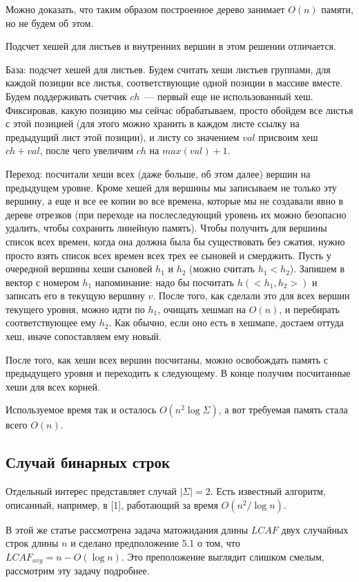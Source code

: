 {Можно доказать, что таким образом построенное дерево занимает $O(n)$ памяти, но не будем об этом.

Подсчет хешей для листьев и внутренних вершин в этом решении отличается.

База: подсчет хешей для листьев. Будем считать хеши листьев группами, для каждой позиции все листья, соответствующие одной позиции в массиве вместе. Будем поддерживать счетчик $ch$~--- первый еще не использованный хеш. Фиксировав, какую позицию мы сейчас обрабатываем, просто обойдем все листья с этой позицией (для этого можно хранить в каждом листе ссылку на предыдущий лист этой позиции), и листу со значением $val$ присвоим хеш $ch+val$, после чего увеличим $ch$ на $max(val)+1$.

Переход: посчитали хеши всех (даже больше, об этом далее) вершин на предыдущем уровне. Кроме хешей для вершины мы записываем не только эту вершину, а еще и все ее копии во все времена, которые мы не создавали явно в дереве отрезков (при переходе на послеследующий уровень их можно безопасно удалить, чтобы сохранить линейную память). Чтобы получить для вершины список всех времен, когда она должна была бы существовать без сжатия, нужно просто взять список всех времен всех трех ее сыновей и смерджить. Пусть у очередной вершины хеши сыновей $h_1$ и $h_2$ (можно считать $h_1 < h_2$). Запишем в вектор с номером $h_1$ напоминание: надо бы посчитать $h(<h_1, h_2>)$ и записать его в текущую вершину $v$. После того, как сделали это для всех вершин текущего уровня, можно идти по $h_1$, очищать хешмап на $O(n)$, и перебирать соответствующее ему $h_2$. Как обычно, если оно есть в хешмапе, достаем оттуда хеш, иначе сопоставляем ему новый. 

После того, как хеши всех вершин посчитаны, можно освобождать память с предыдущего уровня и переходить к следующему. В конце получим посчитанные хеши для всех корней.

Используемое время так и осталось $O(n^2 \log \Sigma)$, а вот требуемая память стала всего $O(n)$.
}

\subsection{Случай бинарных строк}
Отдельный интерес представляет случай $|\Sigma|=2$. Есть известный алгоритм, описанный, например, в [1], работающий за время $O(n^2/\log n)$.

В этой же статье рассмотрена задача матожидания длины $LCAF$ двух случайных строк длины $n$ и сделано предположение 5.1 о том, что $LCAF_{avg} = n - O(\log n)$. Это преположение выглядит слишком смелым, рассмотрим эту задачу подробнее.

